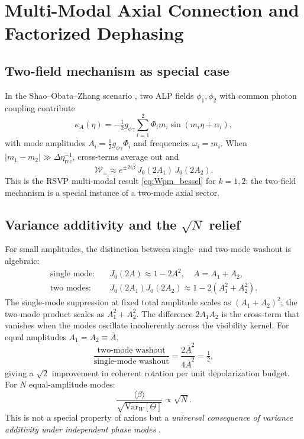 \documentclass[12pt]{article}
\theoremstyle{definition}
\newcommand{\kA}{\kappa_A}
\newcommand{\Wrec}{\Delta\eta_{\mathrm{rec}}}
\newcommand{\Wpm}{\mathcal{W}_\pm}
\newcommand{\VarW}{\mathrm{Var}_W}
\newcommand{\gpg}{g_{\phi\gamma}}
\begin{document}
\section{Multi-Modal Axial Connection and Factorized Dephasing}
\label{sec:multimodal}

\subsection{Two-field mechanism as special case}

In the Shao--Obata--Zhang scenario \cite{ShaoObataZhang2025}, two ALP
fields $\phi_1,\phi_2$ with common photon coupling contribute
\begin{equation}
  \kA(\eta) = -\tfrac{1}{2}\gpg
    \sum_{i=1}^2\Phi_i m_i\sin(m_i\eta+\alpha_i),
  \label{eq:kA_twofield}
\end{equation}
with mode amplitudes $A_i=\tfrac{1}{2}\gpg\Phi_i$ and
frequencies $\omega_i=m_i$.
When $|m_1-m_2|\gg\Wrec^{-1}$, cross-terms average out and
\begin{equation}
  \Wpm \approx e^{\pm2i\bar\beta}\,J_0(2A_1)\,J_0(2A_2).
  \label{eq:Wpm_twofield}
\end{equation}
This is the RSVP multi-modal result \eqref{eq:Wpm_bessel} for $k=1,2$:
the two-field mechanism is a special instance of a two-mode axial sector.

\subsection{Variance additivity and the $\sqrt{N}$ relief}

For small amplitudes, the distinction between single- and two-mode washout
is algebraic:
\begin{align}
  \text{single mode:}&
    \quad J_0(2A)\approx1-2A^2,
    \quad A=A_1+A_2,
    \label{eq:single_small}\\
  \text{two modes:}&
    \quad J_0(2A_1)J_0(2A_2)\approx1-2(A_1^2+A_2^2).
    \label{eq:two_small}
\end{align}
The single-mode suppression at fixed total amplitude scales as
$(A_1+A_2)^2$; the two-mode product scales as $A_1^2+A_2^2$.
The difference $2A_1A_2$ is the cross-term that vanishes when the modes
oscillate incoherently across the visibility kernel.
For equal amplitudes $A_1=A_2\equiv\bar{A}$,
\begin{equation}
  \frac{\text{two-mode washout}}{\text{single-mode washout}}
  = \frac{2\bar{A}^2}{4\bar{A}^2} = \tfrac{1}{2},
\end{equation}
giving a $\sqrt{2}$ improvement in coherent rotation per unit depolarization
budget.
For $N$ equal-amplitude modes:
\begin{equation}
  \frac{\langle\beta\rangle}{\sqrt{\VarW[\Theta]}}
  \propto \sqrt{N}.
  \label{eq:sqrtN}
\end{equation}
This is not a special property of axions but a \emph{universal consequence
of variance additivity under independent phase modes} \cite{Rice1954,Papoulis1991}.
\end{document}
